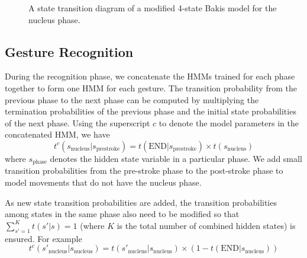 \begin{figure}[tb]
\centering
  \caption{A state transition diagram of a modified 4-state Bakis model for the nucleus phase.}
  \label{fig:bakis}
\end{figure}

\subsection{Gesture Recognition}
During the recognition phase, we concatenate the HMMs trained for each phase together to form
one HMM for each gesture. The transition probability from the previous phase to the next
phase can be computed by multiplying the termination probabilities of the previous phase and the
initial state probabilities of the next phase. Using the superscript $c$ to denote the model
parameters in the concatenated HMM, we have
\begin{displaymath}
t^c(s_\text{nucleus}|s_\text{prestroke}) = t(\text{END}|s_\text{prestroke}) \times t(s_\text{nucleus})
\end{displaymath}
where $s_{\text{phase}}$ denotes the hidden state variable in a particular phase. We add small transition
probabilities from the pre-stroke phase to the post-stroke phase to model movements that do not have the 
nucleus phase.

As new state transition probabilities are added, the transition probabilities among
states in the same phase also need to be modified so that $\sum_{s' = 1}^K t(s'|s) = 1$ (where
$K$ is the total number of combined hidden states) is ensured. For example
\begin{displaymath}
t^c(s'_{\text{nucleus}} | s_{\text{nucleus}}) = t(s'_{\text{nucleus}} | s_{\text{nucleus}})
  \times (1 - t(\text{END} | s_{\text{nucleus}}))
\end{displaymath}

